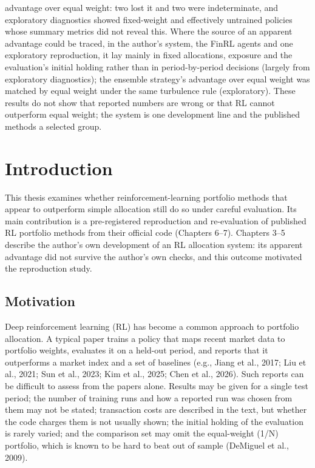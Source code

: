 \documentclass[12pt,a4paper]{report}
\begin{document}
advantage over equal weight: two lost it and two were indeterminate, and
exploratory diagnostics showed fixed-weight and effectively untrained
policies whose summary metrics did not reveal this. Where the source of
an apparent advantage could be traced, in the author's system, the FinRL
agents and one exploratory reproduction, it lay mainly in fixed
allocations, exposure and the evaluation's initial holding rather than
in period-by-period decisions (largely from exploratory diagnostics);
the ensemble strategy's advantage over equal weight was matched by equal
weight under the same turbulence rule (exploratory). These results do
not show that reported numbers are wrong or that RL cannot outperform
equal weight; the system is one development line and the published
methods a selected group.

\tableofcontents

\clearpage{}
\chapter{Introduction}\label{chapter-1.-introduction}

This thesis examines whether reinforcement-learning portfolio methods
that appear to outperform simple allocation still do so under careful
evaluation. Its main contribution is a pre-registered reproduction and
re-evaluation of published RL portfolio methods from their official code
(Chapters 6--7). Chapters 3--5 describe the author's own development of
an RL allocation system: its apparent advantage did not survive the
author's own checks, and this outcome motivated the reproduction study.

\section{Motivation}\label{motivation}

Deep reinforcement learning (RL) has become a common approach to
portfolio allocation. A typical paper trains a policy that maps recent
market data to portfolio weights, evaluates it on a held-out period, and
reports that it outperforms a market index and a set of baselines (e.g.,
Jiang et al., 2017; Liu et al., 2021; Sun et al., 2023; Kim et al.,
2025; Chen et al., 2026). Such reports can be difficult to assess from
the papers alone. Results may be given for a single test period; the
number of training runs and how a reported run was chosen from them may
not be stated; transaction costs are described in the text, but whether
the code charges them is not usually shown; the initial holding of the
evaluation is rarely varied; and the comparison set may omit the
equal-weight (1/N) portfolio, which is known to be hard to beat out of
sample (DeMiguel et al., 2009).
\end{document}
